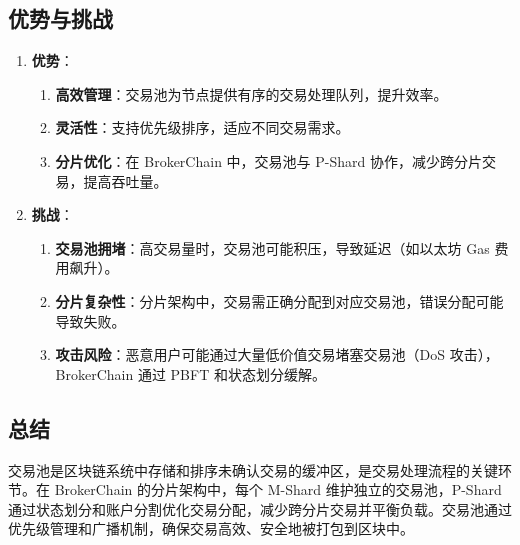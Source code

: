 \documentclass[12pt]{ctexart}
\begin{document}
\subsection{优势与挑战}
\begin{enumerate}
    \item \textbf{优势}：
        \begin{enumerate}
            \item \textbf{高效管理}：交易池为节点提供有序的交易处理队列，提升效率。
            \item \textbf{灵活性}：支持优先级排序，适应不同交易需求。
            \item \textbf{分片优化}：在 BrokerChain 中，交易池与 P-Shard 协作，减少跨分片交易，提高吞吐量。
        \end{enumerate}
    \item \textbf{挑战}：
        \begin{enumerate}
            \item \textbf{交易池拥堵}：高交易量时，交易池可能积压，导致延迟（如以太坊 Gas 费用飙升）。
            \item \textbf{分片复杂性}：分片架构中，交易需正确分配到对应交易池，错误分配可能导致失败。
            \item \textbf{攻击风险}：恶意用户可能通过大量低价值交易堵塞交易池（DoS 攻击），BrokerChain 通过 PBFT 和状态划分缓解。
        \end{enumerate}
\end{enumerate}

\subsection{总结}
交易池是区块链系统中存储和排序未确认交易的缓冲区，是交易处理流程的关键环节。在 BrokerChain 的分片架构中，每个 M-Shard 维护独立的交易池，P-Shard 通过状态划分和账户分割优化交易分配，减少跨分片交易并平衡负载。交易池通过优先级管理和广播机制，确保交易高效、安全地被打包到区块中。
\end{document}

